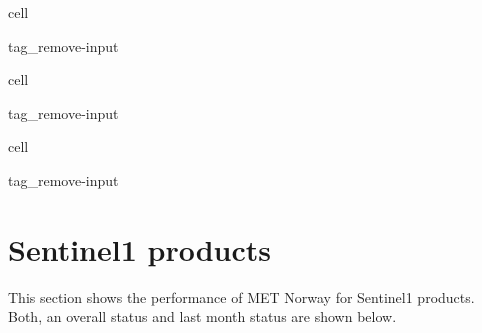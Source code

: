 \documentclass[letterpaper,10pt,english]{jupyterBook}
\begin{document}
\begin{sphinxuseclass}{cell}
\begin{sphinxuseclass}{tag_remove-input}
\end{sphinxuseclass}
\end{sphinxuseclass}
\begin{sphinxuseclass}{cell}
\begin{sphinxuseclass}{tag_remove-input}
\end{sphinxuseclass}
\end{sphinxuseclass}
\begin{sphinxuseclass}{cell}
\begin{sphinxuseclass}{tag_remove-input}
\end{sphinxuseclass}
\end{sphinxuseclass}
\sphinxstepscope


\chapter{Sentinel\sphinxhyphen{}1 products}
\label{\detokenize{S1_portals:sentinel-1-products}}\label{\detokenize{S1_portals::doc}}
\sphinxAtStartPar
This section shows the performance of MET Norway for Sentinel\sphinxhyphen{}1 products. Both, an overall status and last month status are shown below.
\end{document}
